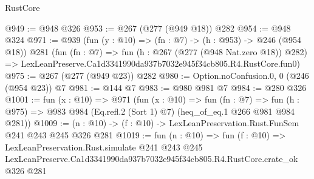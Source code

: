 \begin{lexlean}{RustCore}
\begin{coremodule}
@949 := @948 @326
@953 := @267 (@277 (@949 @18)) @282
@954 := @948 @324
@971 := @939
    (fun (y : @10) => (fn : @7) -> (h : @953) -> @246 (@954 @18))
    @281
    (fun (fn : @7) =>
    fun (h : @267 (@277 (@948 Nat.zero @18)) @282) =>
    LexLeanPreserve.Ca1d3341990da937b7032e945f34cb805.R4.RustCore.fun0)
@975 := @267 (@277 (@949 @23)) @282
@980 := Option.noConfusion.{0, 0} (@246 (@954 @23)) @7
@981 := @144 @7
@983 := @980 @981 @7
@984 := @280 @326
@1001 := fun (x : @10) =>
  @971
    (fun (x : @10) =>
    fun (fn : @7) =>
    fun (h : @975) => @983 @984 (Eq.refl.{2} (Sort 1) @7) (heq_of_eq.{1} @266 @981 @984 @281))
@1009 := (n : @10) -> (f : @10) -> LexLeanPreservation.Rust.FunSem @241 @243 @245 @326 @281
@1019 := fun (n : @10) =>
  fun (f : @10) =>
  LexLeanPreservation.Rust.simulate
    @241
    @243
    @245
    LexLeanPreserve.Ca1d3341990da937b7032e945f34cb805.R4.RustCore.crate_ok
    @326
    @281
\end{coremodule}
\end{lexlean}
